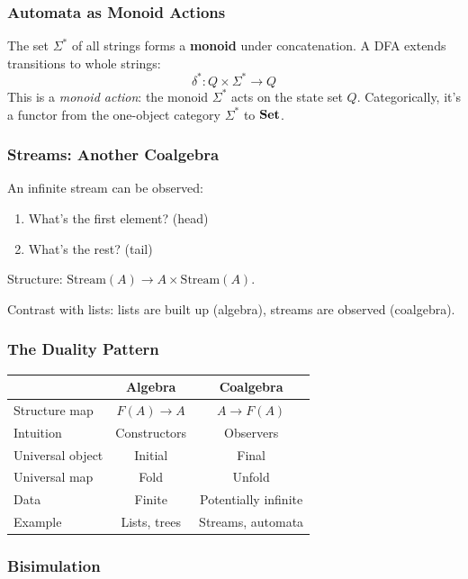 \begin{goingdeeper}
\subsubsection*{Automata as Monoid Actions}

The set $\Sigma^*$ of all strings forms a \textbf{monoid} under concatenation. A DFA extends transitions to whole strings:
\[
\delta^*: Q \times \Sigma^* \to Q
\]
This is a \emph{monoid action}: the monoid $\Sigma^*$ acts on the state set $Q$. Categorically, it's a functor from the one-object category $\Sigma^*$ to $\mathbf{Set}$.

\subsubsection*{Streams: Another Coalgebra}

An infinite stream can be observed:
\begin{enumerate}
  \item What's the first element? (head)
  \item What's the rest? (tail)
\end{enumerate}

Structure: $\text{Stream}(A) \to A \times \text{Stream}(A)$.

Contrast with lists: lists are built up (algebra), streams are observed (coalgebra).

\subsubsection*{The Duality Pattern}

\begin{center}
\begin{tabular}{lcc}
& \textbf{Algebra} & \textbf{Coalgebra} \\
\hline
Structure map & $F(A) \to A$ & $A \to F(A)$ \\
Intuition & Constructors & Observers \\
Universal object & Initial & Final \\
Universal map & Fold & Unfold \\
Data & Finite & Potentially infinite \\
Example & Lists, trees & Streams, automata
\end{tabular}
\end{center}

\subsubsection*{Bisimulation}


\end{goingdeeper}
